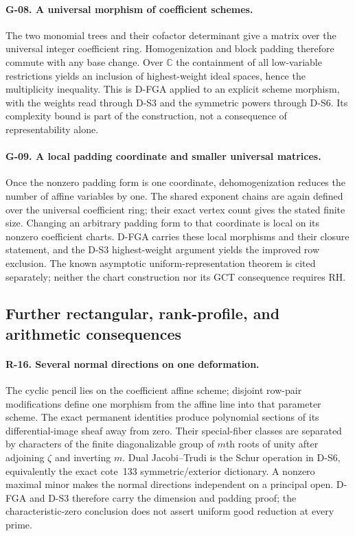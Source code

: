 \paragraph{G-08. A universal morphism of coefficient schemes.}
The two monomial trees and their cofactor determinant give a matrix over the universal integer coefficient ring. Homogenization and block padding therefore commute with any base change. Over $\mathbb C$ the containment of all low-variable restrictions yields an inclusion of highest-weight ideal spaces, hence the multiplicity inequality. This is D-FGA applied to an explicit scheme morphism, with the weights read through D-S3 and the symmetric powers through D-S6. Its complexity bound is part of the construction, not a consequence of representability alone.

\paragraph{G-09. A local padding coordinate and smaller universal matrices.}
Once the nonzero padding form is one coordinate, dehomogenization reduces the number of affine variables by one. The shared exponent chains are again defined over the universal coefficient ring; their exact vertex count gives the stated finite size. Changing an arbitrary padding form to that coordinate is local on its nonzero coefficient charts. D-FGA carries these local morphisms and their closure statement, and the D-S3 highest-weight argument yields the improved row exclusion. The known asymptotic uniform-representation theorem is cited separately; neither the chart construction nor its GCT consequence requires RH.


\subsection{Further rectangular, rank-profile, and arithmetic consequences}

\paragraph{R-16. Several normal directions on one deformation.}
The cyclic pencil lies on the coefficient affine scheme; disjoint row-pair modifications define one morphism from the affine line into that parameter scheme. The exact permanent identities produce polynomial sections of its differential-image sheaf away from zero. Their special-fiber classes are separated by characters of the finite diagonalizable group of $m$th roots of unity after adjoining $\zeta$ and inverting $m$. Dual Jacobi--Trudi is the Schur operation in D-S6, equivalently the exact cote~133 symmetric/exterior dictionary. A nonzero maximal minor makes the normal directions independent on a principal open. D-FGA and D-S3 therefore carry the dimension and padding proof; the characteristic-zero conclusion does not assert uniform good reduction at every prime.

